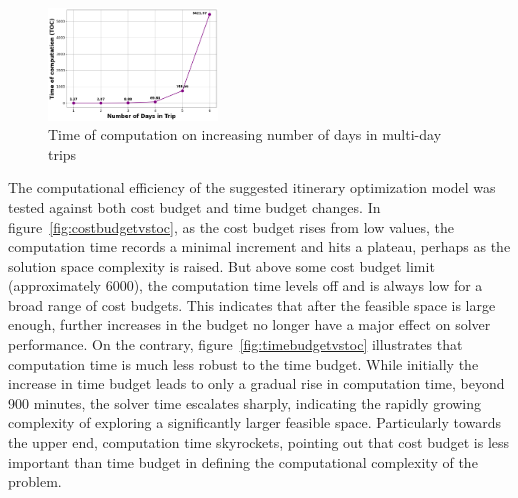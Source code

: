 \begin{figure}[th]
    \centering
\includegraphics[width=0.4\textwidth]{plots/multidayvstoc.png}
     \caption{Time of computation on increasing number of days in multi-day trips}
    \label{fig:scalability2}
\end{figure}








\noindent The computational efficiency of the suggested itinerary optimization model was tested against both cost budget and time budget changes. In figure~\ref{fig:costbudgetvstoc}, as the cost budget rises from low values, the computation time records a minimal increment and hits a plateau, perhaps as the solution space complexity is raised. But above some cost budget limit (approximately 6000), the computation time levels off and is always low for a broad range of cost budgets. This indicates that after the feasible space is large enough, further increases in the budget no longer have a major effect on solver performance. On the contrary, figure~\ref{fig:timebudgetvstoc} illustrates that computation time is much less robust to the time budget. While initially the increase in time budget leads to only a gradual rise in computation time, beyond 900 minutes, the solver time escalates sharply, indicating the rapidly growing complexity of exploring a significantly larger feasible space. Particularly towards the upper end, computation time skyrockets, pointing out that cost budget is less important than time budget in defining the computational complexity of the problem.

